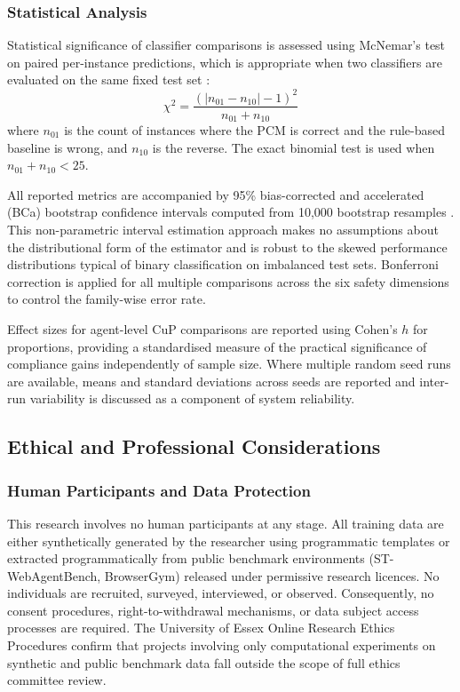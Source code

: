 \documentclass[12pt,a4paper]{article}
\begin{document}
\subsubsection{Statistical Analysis}

Statistical significance of classifier comparisons is assessed using McNemar's
test \citep{mcnemar1947note} on paired per-instance predictions, which is
appropriate when two classifiers are evaluated on the same fixed test set
\citep{wohlin2012experimentation}:
\begin{equation}
  \chi^2 = \frac{(|n_{01} - n_{10}| - 1)^2}{n_{01} + n_{10}}
\end{equation}
where $n_{01}$ is the count of instances where the PCM is correct and the
rule-based baseline is wrong, and $n_{10}$ is the reverse. The exact binomial
test is used when $n_{01} + n_{10} < 25$.

All reported metrics are accompanied by 95\% bias-corrected and accelerated (BCa)
bootstrap confidence intervals computed from 10,000 bootstrap resamples
\citep{efron1993bootstrap}. This non-parametric interval estimation approach makes
no assumptions about the distributional form of the estimator and is robust to the
skewed performance distributions typical of binary classification on imbalanced
test sets. Bonferroni correction is applied for all multiple comparisons across
the six safety dimensions to control the family-wise error rate.

Effect sizes for agent-level CuP comparisons are reported using Cohen's $h$ for
proportions, providing a standardised measure of the practical significance of
compliance gains independently of sample size. Where multiple random seed runs are
available, means and standard deviations across seeds are reported and
inter-run variability is discussed as a component of system reliability.

\subsection{Ethical and Professional Considerations}

\subsubsection{Human Participants and Data Protection}

This research involves no human participants at any stage. All training data are
either synthetically generated by the researcher using programmatic templates or
extracted programmatically from public benchmark environments (ST-WebAgentBench,
BrowserGym) released under permissive research licences. No individuals are
recruited, surveyed, interviewed, or observed. Consequently, no consent
procedures, right-to-withdrawal mechanisms, or data subject access processes are
required. The University of Essex Online Research Ethics Procedures confirm that
projects involving only computational experiments on synthetic and public
benchmark data fall outside the scope of full ethics committee review.
\end{document}
